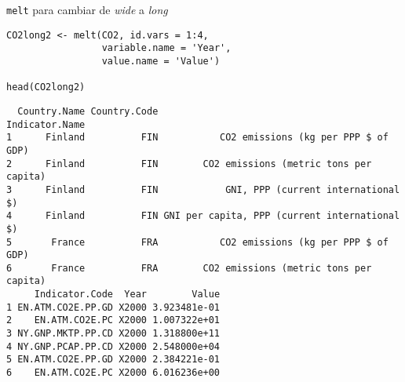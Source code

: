 \documentclass[xcolor={usenames,svgnames,dvipsnames}]{beamer}
\begin{document}
\begin{frame}[fragile,label=sec-3-3-2]{\texttt{melt} para cambiar de \emph{wide} a \emph{long}}
 \lstset{language=R,label= ,caption= ,numbers=none}
\begin{lstlisting}
CO2long2 <- melt(CO2, id.vars = 1:4,
                 variable.name = 'Year',
                 value.name = 'Value')

head(CO2long2)
\end{lstlisting}

\begin{verbatim}
  Country.Name Country.Code                                Indicator.Name
1      Finland          FIN           CO2 emissions (kg per PPP $ of GDP)
2      Finland          FIN        CO2 emissions (metric tons per capita)
3      Finland          FIN            GNI, PPP (current international $)
4      Finland          FIN GNI per capita, PPP (current international $)
5       France          FRA           CO2 emissions (kg per PPP $ of GDP)
6       France          FRA        CO2 emissions (metric tons per capita)
     Indicator.Code  Year        Value
1 EN.ATM.CO2E.PP.GD X2000 3.923481e-01
2    EN.ATM.CO2E.PC X2000 1.007322e+01
3 NY.GNP.MKTP.PP.CD X2000 1.318800e+11
4 NY.GNP.PCAP.PP.CD X2000 2.548000e+04
5 EN.ATM.CO2E.PP.GD X2000 2.384221e-01
6    EN.ATM.CO2E.PC X2000 6.016236e+00
\end{verbatim}
\end{frame}
\end{document}

